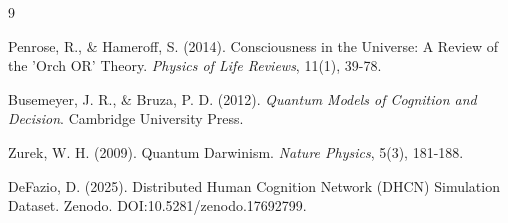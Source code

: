 \documentclass[12pt, letterpaper]{article}
\begin{document}

\begin{thebibliography}{9}

Penrose, R., \& Hameroff, S. (2014). Consciousness in the Universe: A Review of the 'Orch OR' Theory. \textit{Physics of Life Reviews}, 11(1), 39-78.

Busemeyer, J. R., \& Bruza, P. D. (2012). \textit{Quantum Models of Cognition and Decision}. Cambridge University Press.

Zurek, W. H. (2009). Quantum Darwinism. \textit{Nature Physics}, 5(3), 181-188.

DeFazio, D. (2025). Distributed Human Cognition Network (DHCN) Simulation Dataset. Zenodo. DOI:10.5281/zenodo.17692799.

\end{thebibliography}
\end{document}
